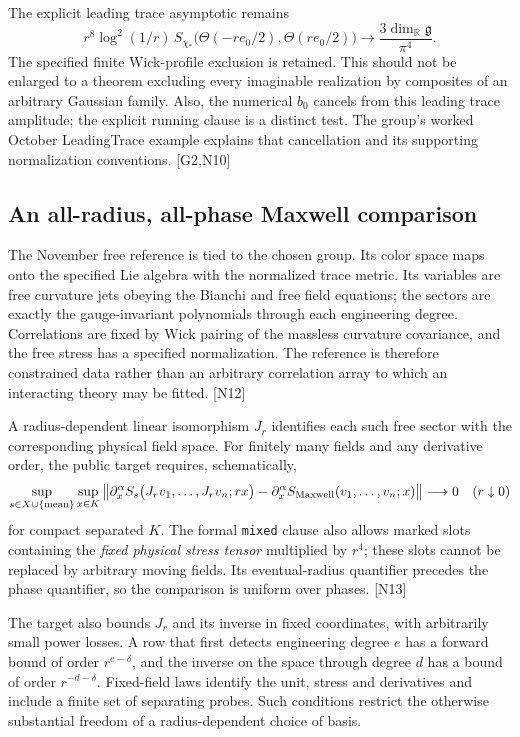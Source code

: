 \documentclass[11pt]{article}
\newcommand{\R}{\mathbb R}
\newcommand{\g}{\mathfrak g}
\newcommand{\code}[1]{{\small\nolinkurl{#1}}}
\newcommand{\src}[1]{\textsf{[#1]}}
\begin{document}
The explicit leading trace asymptotic remains
\[
 r^8\log^2(1/r)\,S_{\chi_*}\bigl(\Theta(-re_0/2),\Theta(re_0/2)\bigr)
 \longrightarrow \frac{3\dim_\R\g}{\pi^4}.
\]
The specified finite Wick-profile exclusion is retained. This should not
be enlarged to a theorem excluding every imaginable realization by
composites of an arbitrary Gaussian family. Also, the numerical $b_0$
cancels from this leading trace amplitude; the explicit running clause is
a distinct test. The group's worked October LeadingTrace example explains
that cancellation and its supporting normalization conventions. \src{G2,N10}

\subsection{An all-radius, all-phase Maxwell comparison}
\label{sec:maxwell}

The November free reference is tied to the chosen group. Its color space
maps onto the specified Lie algebra with the normalized trace metric.
Its variables are free curvature jets obeying the Bianchi and free field
equations; the sectors are exactly the gauge-invariant polynomials through
each engineering degree. Correlations are fixed by Wick pairing of the
massless curvature covariance, and the free stress has a specified
normalization. The reference is therefore constrained data rather than an
arbitrary correlation array to which an interacting theory may be fitted.
\src{N12}

A radius-dependent linear isomorphism $J_r$ identifies each such free
sector with the corresponding physical field space. For finitely many
fields and any derivative order, the public target requires, schematically,
\begin{equation}\label{eq:maxwell}
 \sup_{s\in X\cup\{\mathrm{mean}\}}\sup_{x\in K}
 \left\|\partial^\alpha_x
 S_s\bigl(J_rv_1,\ldots,J_rv_n;rx\bigr)
 -\partial^\alpha_x S_{\rm Maxwell}(v_1,\ldots,v_n;x)\right\|
 \longrightarrow0\quad(r\downarrow0)
\end{equation}
for compact separated $K$. The formal \code{mixed} clause also allows
marked slots containing the \emph{fixed physical stress tensor} multiplied
by $r^4$; these slots cannot be replaced by arbitrary moving fields.
Its eventual-radius quantifier precedes the phase quantifier, so the
comparison is uniform over phases. \src{N13}

The target also bounds $J_r$ and its inverse in fixed coordinates, with
arbitrarily small power losses. A row that first detects engineering degree
$e$ has a forward bound of order $r^{e-\delta}$, and the inverse on the
space through degree $d$ has a bound of order $r^{-d-\delta}$. Fixed-field
laws identify the unit, stress and derivatives and include a finite set of
separating probes. Such conditions restrict the otherwise substantial
freedom of a radius-dependent choice of basis.
\end{document}
